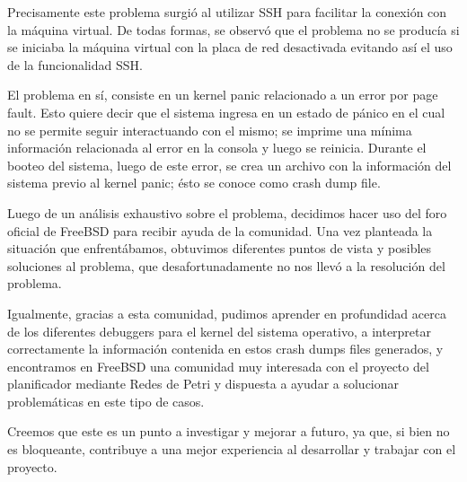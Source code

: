 Precisamente este problema surgió al utilizar SSH para facilitar la conexión con la máquina virtual. De todas formas, se observó que el problema no se producía si se iniciaba la máquina virtual con la placa de red desactivada evitando así el uso de la funcionalidad SSH.

El problema en sí, consiste en un kernel panic relacionado a un error por page fault. Esto quiere decir que el sistema ingresa en un estado de pánico en el cual no se permite seguir interactuando con el mismo; se imprime una mínima información relacionada al error en la consola y luego se reinicia. Durante el booteo del sistema, luego de este error, se crea un archivo con la información del sistema previo al kernel panic; ésto se conoce como crash dump file.

Luego de un análisis exhaustivo sobre el problema, decidimos hacer uso del foro oficial de FreeBSD para recibir ayuda de la comunidad. Una vez planteada la situación que enfrentábamos, obtuvimos diferentes puntos de vista y posibles soluciones al problema, que desafortunadamente no nos llevó a la resolución del problema.


Igualmente, gracias a esta comunidad, pudimos aprender en profundidad acerca de los diferentes debuggers para el kernel del sistema operativo, a interpretar correctamente la información contenida en estos crash dumps files generados, y encontramos en FreeBSD una comunidad muy interesada con el proyecto del planificador mediante Redes de Petri y dispuesta a ayudar a solucionar problemáticas en este tipo de casos.


Creemos que este es un punto a investigar y mejorar a futuro, ya que, si bien no es bloqueante, contribuye a una mejor experiencia al desarrollar y trabajar con el proyecto.
